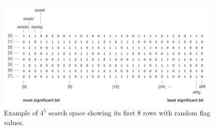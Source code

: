 \begin{figure}[t]
	\centering
	\includegraphics[width=5in]{contents/00_images/search_space}\vspace*{5pt}
	\caption{Example of $4^{5}$ search space showing its first 8 rows with random flag values.}
	\label{fig:sample_search_space}
\end{figure}